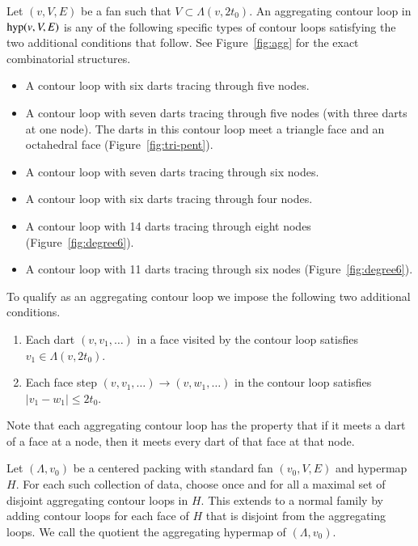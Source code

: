 \begin{definition}
Let $(v,V,E)$ be a fan such that $V\subset \Lambda(v,2t_0)$.
An aggregating contour loop in ${\operatorname{hyp}}(v,V,E)$ 
is any of the following specific
types of contour loops satisfying the 
two additional conditions that follow.
See Figure~\ref{fig:agg} %
for the exact combinatorial structures.
\begin{itemize}
\item A contour loop with six darts tracing through five nodes. 
\item A contour loop with seven darts tracing through five nodes (with three
  darts at one node).
   The darts in this contour loop
   meet a triangle face and an octahedral face (Figure~\ref{fig:tri-pent}). 
\item A contour loop with seven darts tracing through six nodes.
\item A contour loop with six darts tracing through four nodes. 
\item A contour loop with 14 darts tracing through eight nodes
   (Figure~\ref{fig:degree6}). %
\item A contour loop with 11 darts tracing through six nodes %
   (Figure~\ref{fig:degree6}).
\end{itemize}
To qualify as an aggregating 
contour loop we impose the following two additional conditions.
\begin{enumerate}
\item Each dart $(v,v_1,\ldots)$ in a face visited by the contour 
loop satisfies $v_1\in \Lambda(v,2t_0)$.
\item Each face step $(v,v_1,\ldots)\to (v,w_1,\ldots)$ in the contour
loop satisfies $|v_1-w_1|\le 2t_0$.
\end{enumerate}
\end{definition}

Note that each aggregating contour loop has the property that
if it meets a dart of a face at a node, then it meets every dart
of that face at that node.

\begin{definition}  Let $(\Lambda,v_0)$ be a centered packing with
standard fan $(v_0,V,E)$ and hypermap $H$.  For
each such collection of data, choose once and for all
a maximal set of disjoint aggregating
contour loops in $H$.  This extends to a normal family by adding
contour loops for each face of $H$ that is disjoint from the aggregating
loops.    We call the quotient the aggregating hypermap of $(\Lambda,v_0)$.
\end{definition}

